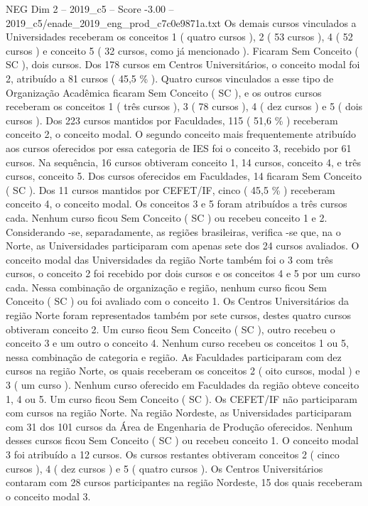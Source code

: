\begin{textsample}{NEG Dim 2 – 2019\_c5 – Score -3.00 – 2019\_c5/enade\_2019\_eng\_prod\_c7c0e9871a.txt}
Os demais cursos vinculados a Universidades receberam os conceitos 1 ( quatro cursos ), 2 ( 53 cursos ), 4 ( 52 cursos ) e conceito 5 ( 32 cursos, como já mencionado ).
Ficaram Sem Conceito ( SC ), dois cursos.
Dos 178 cursos em Centros Universitários, o conceito modal foi 2, atribuído a 81 cursos ( 45,5 \% ).
Quatro cursos vinculados a esse tipo de Organização Acadêmica ficaram Sem Conceito ( SC ), e os outros cursos receberam os conceitos 1 ( três cursos ), 3 ( 78 cursos ), 4 ( dez cursos ) e 5 ( dois cursos ).
Dos 223 cursos mantidos por Faculdades, 115 ( 51,6 \% ) receberam conceito 2, o conceito modal.
O segundo conceito mais frequentemente atribuído aos cursos oferecidos por essa categoria de IES foi o conceito 3, recebido por 61 cursos.
Na sequência, 16 cursos obtiveram conceito 1, 14 cursos, conceito 4, e três cursos, conceito 5.
Dos cursos oferecidos em Faculdades, 14 ficaram Sem Conceito ( SC ).
Dos 11 cursos mantidos por CEFET/IF, cinco ( 45,5 \% ) receberam conceito 4, o conceito modal.
Os conceitos 3 e 5 foram atribuídos a três cursos cada.
Nenhum curso ficou Sem Conceito ( SC ) ou recebeu conceito 1 e 2.
Considerando -se, separadamente, as regiões brasileiras, verifica -se que, na o Norte, as Universidades participaram com apenas sete dos 24 cursos avaliados.
O conceito modal das Universidades da região Norte também foi o 3 com três cursos, o conceito 2 foi recebido por dois cursos e os conceitos 4 e 5 por um curso cada.
Nessa combinação de organização e região, nenhum curso ficou Sem Conceito ( SC ) ou foi avaliado com o conceito 1.
Os Centros Universitários da região Norte foram representados também por sete cursos, destes quatro cursos obtiveram conceito 2.
Um curso ficou Sem Conceito ( SC ), outro recebeu o conceito 3 e um outro o conceito 4.
Nenhum curso recebeu os conceitos 1 ou 5, nessa combinação de categoria e região.
As Faculdades participaram com dez cursos na região Norte, os quais receberam os conceitos 2 ( oito cursos, modal ) e 3 ( um curso ).
Nenhum curso oferecido em Faculdades da região obteve conceito 1, 4 ou 5.
Um curso ficou Sem Conceito ( SC ).
Os CEFET/IF não participaram com cursos na região Norte.
Na região Nordeste, as Universidades participaram com 31 dos 101 cursos da Área de Engenharia de Produção oferecidos.
Nenhum desses cursos ficou Sem Conceito ( SC ) ou recebeu conceito 1.
O conceito modal 3 foi atribuído a 12 cursos.
Os cursos restantes obtiveram conceitos 2 ( cinco cursos ), 4 ( dez cursos ) e 5 ( quatro cursos ).
Os Centros Universitários contaram com 28 cursos participantes na região Nordeste, 15 dos quais receberam o conceito modal 3.

\end{textsample}
